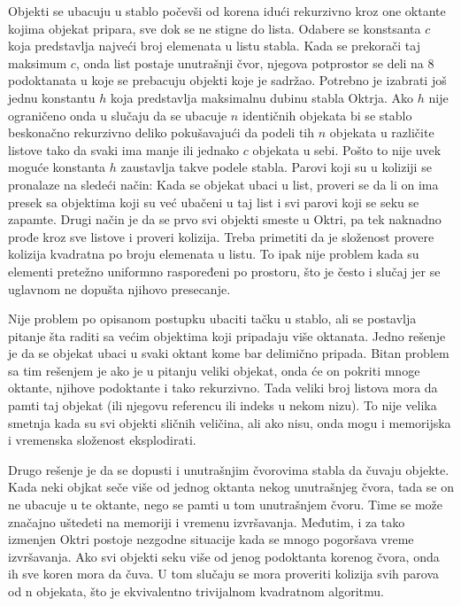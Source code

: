 \documentclass{article}
\begin{document}
{Objekti se ubacuju u stablo počevši od korena idući rekurzivno kroz one oktante kojima objekat pripara,
sve dok se ne stigne do lista.
Odabere se konstsanta $c$ koja predstavlja najveći broj elemenata u listu stabla. 
Kada se prekorači taj maksimum $c$, onda list postaje unutrašnji čvor, njegova potprostor se deli 
na 8 podoktanata u koje se prebacuju objekti koje je sadržao.
Potrebno je izabrati još jednu konstantu $h$ koja predstavlja maksimalnu dubinu stabla Oktrja.
Ako $h$ nije ograničeno onda u slučaju da se ubacuje $n$ identičnih objekata bi se stablo 
beskonačno rekurzivno deliko pokušavajući da podeli tih $n$ objekata u različite listove 
tako da svaki ima manje ili jednako $c$ objekata u sebi. 
Pošto to nije uvek moguće konstanta $h$ zaustavlja takve podele stabla.
Parovi koji su u koliziji se pronalaze na sledeći način:
Kada se objekat ubaci u list, proveri se da li on ima presek sa objektima koji su već
ubačeni u taj list i svi parovi koji se seku se zapamte.
Drugi način je da se prvo svi objekti smeste u Oktri, pa tek naknadno prođe kroz sve listove 
i proveri kolizija. 
Treba primetiti da je složenost provere kolizija kvadratna po broju elemenata u listu.
To ipak nije problem kada su elementi pretežno uniformno raspoređeni po prostoru, što je često 
i slučaj jer se uglavnom ne dopušta njihovo presecanje. 

Nije problem po opisanom postupku ubaciti tačku u stablo, ali se postavlja pitanje šta raditi sa većim objektima
koji pripadaju više oktanata.
Jedno rešenje je da se objekat ubaci u svaki oktant kome bar delimično pripada. 
Bitan problem sa tim rešenjem je ako je u pitanju veliki objekat, onda će on pokriti mnoge oktante, njihove 
podoktante i tako rekurzivno. Tada veliki broj listova mora da pamti taj objekat (ili njegovu referencu ili indeks u nekom nizu).
To nije velika smetnja kada su svi objekti sličnih veličina, ali ako 
nisu, onda mogu i memorijska i vremenska složenost eksplodirati. 

Drugo rešenje je da se dopusti i unutrašnjim čvorovima stabla da čuvaju objekte.
Kada neki objkat seče više od jednog oktanta nekog unutrašnjeg čvora, tada se on ne ubacuje 
u te oktante, nego se pamti u tom unutrašnjem čvoru. Time se može značajno uštedeti na memoriji i vremenu izvršavanja.
Međutim, i za tako izmenjen Oktri postoje nezgodne situacije kada se mnogo pogoršava vreme izvršavanja.
Ako svi objekti seku više od jenog podoktanta korenog čvora, onda ih sve koren mora da čuva. 
U tom slučaju se mora proveriti kolizija svih parova od n objekata, što je ekvivalentno trivijalnom kvadratnom algoritmu.

}
\end{document}
